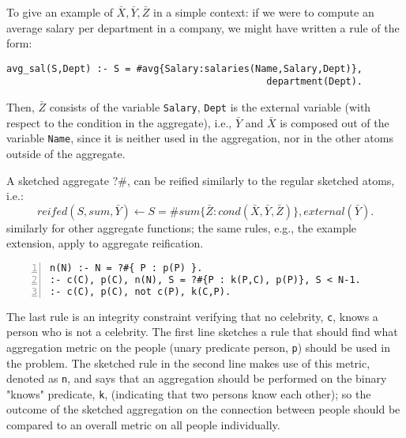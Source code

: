 To give an example of $\bar X, \bar Y, \bar Z$ in a simple context: if we were to compute an average salary per department in a company, we might have written a rule of the form:

\begin{Verbatim}[fontsize=\small]
avg_sal(S,Dept) :- S = #avg{Salary:salaries(Name,Salary,Dept)}, 
                                              department(Dept).
\end{Verbatim}

	Then, $\bar Z$ consists of the variable \verb|Salary|, \verb|Dept| is the external variable (with respect to the condition in the aggregate), i.e., $\bar Y$ and $\bar X$ is composed out of the variable \verb|Name|, since it is neither used in the aggregation, nor in the other atoms outside of the aggregate.

A sketched aggregate $?\#$, can be reified similarly to the regular sketched atoms, i.e.:
\begin{equation*}
  \textit{reifed}(S,sum,\bar Y) \leftarrow S = \#\textit{sum} \{ \bar Z : \textit{cond}(\bar X, \bar Y, \bar Z) \}, \textit{external}(\bar Y).
\end{equation*}
similarly for other aggregate functions; the same rules, e.g., the example extension, apply to aggregate reification. 


\begin{Verbatim}[fontsize=\normalsize,numbers=left,xleftmargin=2mm]
n(N) :- N = ?#{ P : p(P) }.
:- c(C), p(C), n(N), S = ?#{P : k(P,C), p(P)}, S < N-1.
:- c(C), p(C), not c(P), k(C,P).
\end{Verbatim} 
The last rule is an integrity constraint verifying that no celebrity, \texttt{c}, knows a person who is not a celebrity. The first line sketches a rule that should find what aggregation metric on the people (unary predicate person, \texttt{p}) should be used in the problem. The sketched rule in the second line makes use of this metric, denoted as \texttt{n}, and says that an aggregation should be performed on the binary "knows" predicate, \texttt{k}, (indicating that two persons know each other); so the outcome of the sketched aggregation on the connection between people should be compared to an overall metric on all people individually.

